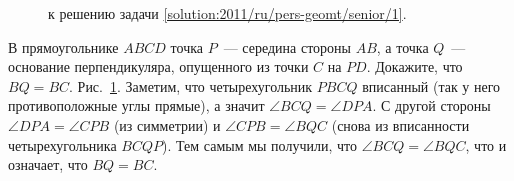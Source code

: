 \ifsolution
\begin{figure}\centering
    \caption{к решению задачи \ref{solution:2011/ru/pers-geomt/senior/1}.}
    \label{fig:solution:2011/ru/pers-geomt/senior/1}
\end{figure}%
\fi %

\problem
В прямоугольнике $ABCD$ точка $P$~--- середина стороны $AB$, а точка
$Q$~--- основание перпендикуляра, опущенного из точки $C$ на $PD$.
Докажите, что $BQ = BC$.
\solution
\label{solution:2011/ru/pers-geomt/senior/1}%
Рис.~\ref{fig:solution:2011/ru/pers-geomt/senior/1}.
Заметим, что четырехугольник $PBCQ$ вписанный
(так у него противоположные углы прямые),
а значит $\angle BCQ = \angle DPA$.
С другой стороны $\angle DPA = \angle CPB$ (из симметрии) и
$\angle CPB = \angle BQC$ (снова из вписанности четырехугольника $BCQP$).
Тем самым мы получили, что $\angle BCQ = \angle BQC$, что и означает, что
$BQ = BC$.
\endproblem
